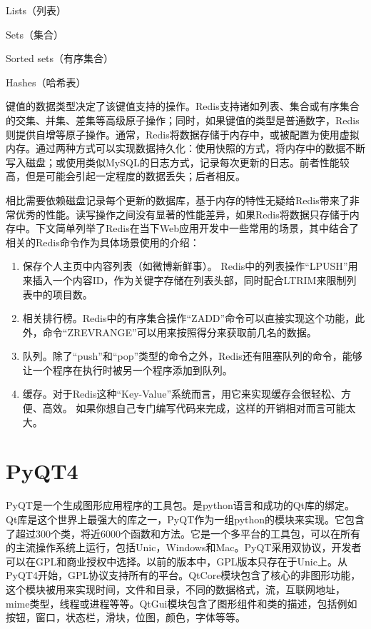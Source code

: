 \documentclass{zjutthesis}
\begin{document}
Lists（列表）

Sets（集合）

Sorted sets（有序集合）

Hashes（哈希表）

键值的数据类型决定了该键值支持的操作。Redis支持诸如列表、集合或有序集合的交集、并集、差集等高级原子操作；同时，如果键值的类型是普通数字，Redis则提供自增等原子操作。通常，Redis将数据存储于内存中，或被配置为使用虚拟内存。通过两种方式可以实现数据持久化：使用快照的方式，将内存中的数据不断写入磁盘；或使用类似MySQL的日志方式，记录每次更新的日志。前者性能较高，但是可能会引起一定程度的数据丢失；后者相反。

相比需要依赖磁盘记录每个更新的数据库，基于内存的特性无疑给Redis带来了非常优秀的性能。读写操作之间没有显著的性能差异，如果Redis将数据只存储于内存中。下文简单列举了Redis在当下Web应用开发中一些常用的场景，其中结合了相关的Redis命令作为具体场景使用的介绍：

\begin{enumerate}[label=（\arabic*）]
\item{保存个人主页中内容列表（如微博新鲜事）。
Redis中的列表操作“LPUSH”用来插入一个内容ID，作为关键字存储在列表头部，同时配合LTRIM来限制列表中的项目数。}

\item{相关排行榜。Redis中的有序集合操作“ZADD”命令可以直接实现这个功能，此外，命令“ZREVRANGE”可以用来按照得分来获取前几名的数据。}

\item{队列。除了“push”和“pop”类型的命令之外，Redis还有阻塞队列的命令，能够让一个程序在执行时被另一个程序添加到队列。}

\item{缓存。对于Redis这种“Key-Value”系统而言，用它来实现缓存会很轻松、方便、高效。
如果你想自己专门编写代码来完成，这样的开销相对而言可能太大。}
\end{enumerate}

\section{PyQT4}
PyQT是一个生成图形应用程序的工具包。是python语言和成功的Qt库的绑定。Qt库是这个世界上最强大的库之一，PyQT作为一组python的模块来实现。它包含了超过300个类，将近6000个函数和方法。它是一个多平台的工具包，可以在所有的主流操作系统上运行，包括Unic，Windows和Mac。PyQT采用双协议，开发者可以在GPL和商业授权中选择。以前的版本中，GPL版本只存在于Unic上。从PyQT4开始，GPL协议支持所有的平台。QtCore模块包含了核心的非图形功能，这个模块被用来实现时间，文件和目录，不同的数据格式，流，互联网地址，mime类型，线程或进程等等。QtGui模块包含了图形组件和类的描述，包括例如按钮，窗口，状态栏，滑块，位图，颜色，字体等等。
\end{document}
